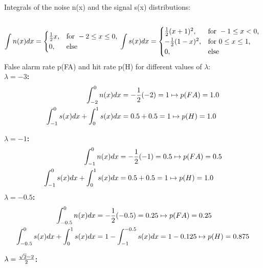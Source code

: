 \documentclass[a4paper]{scrartcl}
\begin{document}
Integrals of the noise n(x) and the signal s(x) distributions:\\\\
\begin{equation}
	\int n(x)dx=\begin{cases}
	  {1\over 2}x,  & \text{for } -2 \leq x \leq 0\text{,}\\
	  0, & \text{else }
	\end{cases}\\\\\\
	\int s(x)dx=\begin{cases}
	  {1\over 2}(x+1)^2,  & \text{for } -1 \leq x < 0\text{,}\\
	  -{1\over 2}(1-x)^2,  & \text{for } 0 \leq x \leq 1\text{,}\\
	  0, & \text{else }
	\end{cases}\\\\
\end{equation}
False alarm rate p(FA) and hit rate p(H) for different values of $\lambda$:\\

\textbf{$\lambda = -3$:} \\

\begin{align*}
\int_{-2}^0n(x)dx &= -{1\over2}(-2) = 1 \mapsto p(FA) = 1.0 \\
\int_{-1}^0s(x)dx + \int_{0}^1s(x)dx &= 0.5 + 0.5 = 1\mapsto p(H) = 1.0
\end{align*}

\textbf{$\lambda = -1$:} \\

\begin{align*}
\int_{-1}^0n(x)dx &= -{1\over2}(-1) = 0.5 \mapsto p(FA) = 0.5 \\
\int_{-1}^0s(x)dx + \int_{0}^1s(x)dx &= 0.5 + 0.5 = 1\mapsto p(H) = 1.0
\end{align*}
\newpage
\textbf{$\lambda = -0.5$:} \\

\begin{align*}
\int_{-0.5}^0n(x)dx &= -{1\over2}(-0.5) = 0.25 \mapsto p(FA) = 0.25 \\
\int_{-0.5}^0s(x)dx + \int_{0}^1s(x)dx &= 1 - \int_{-1}^{-0.5}s(x)dx = 1 - 0.125 \mapsto p(H) = 0.875
\end{align*}

\textbf{$\lambda = {\sqrt{2}-2\over 2}$:} \\
\end{document}
